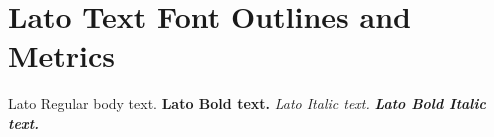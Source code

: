 \documentclass{article}
\begin{document}
\section{Lato Text Font Outlines and Metrics}

Lato Regular body text.
\textbf{Lato Bold text.}
\textit{Lato Italic text.}
\textbf{\textit{Lato Bold Italic text.}}
\end{document}

